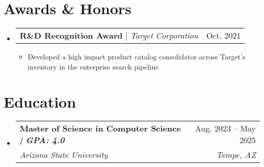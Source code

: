 \documentclass[letterpaper,11pt]{article}
\makeatletter
\newcommand{\resumeItem}[1]{
  \item\small{
    {#1 \vspace{-1pt}}
  }
}
\newcommand{\resumeSubheading}[4]{
  \vspace{-2pt}\item
    \begin{tabular*}{0.97\textwidth}[t]{l@{\extracolsep{\fill}}r}
      \textbf{#1} & #2 \\
      \textit{\small#3} & \textit{\small #4} \\
    \end{tabular*}\vspace{-7pt}
}
\newcommand{\resumeProjectHeading}[2]{
    \item
    \begin{tabular*}{0.97\textwidth}{l@{\extracolsep{\fill}}r}
      \small#1 & #2 \\
    \end{tabular*}\vspace{-7pt}
}
\newcommand{\resumeSubHeadingListStart}{\begin{itemize}[leftmargin=0.15in, label={}]}
\newcommand{\resumeSubHeadingListEnd}{\end{itemize}}
\newcommand{\resumeItemListStart}{\begin{itemize}}
\newcommand{\resumeItemListEnd}{\end{itemize}\vspace{-5pt}}
\makeatother
\begin{document}
\section{Awards \& Honors}
    \resumeSubHeadingListStart
      \resumeProjectHeading
          {\textbf{R\&D Recognition Award} $|$ \emph{Target Corporation}}{Oct. 2021}
          \resumeItemListStart
            \resumeItem{Developed a high impact product catalog consolidator across Target's inventory in the enterprise search pipeline}
          \resumeItemListEnd
    \resumeSubHeadingListEnd

\section{Education}
  \resumeSubHeadingListStart
    \resumeSubheading
      {Master of Science in Computer Science \textnormal{\textit{| GPA: 4.0}}}{Aug. 2023 -- May 2025}
      {Arizona State University}{Tempe, AZ}
  \resumeSubHeadingListEnd


\end{document}
